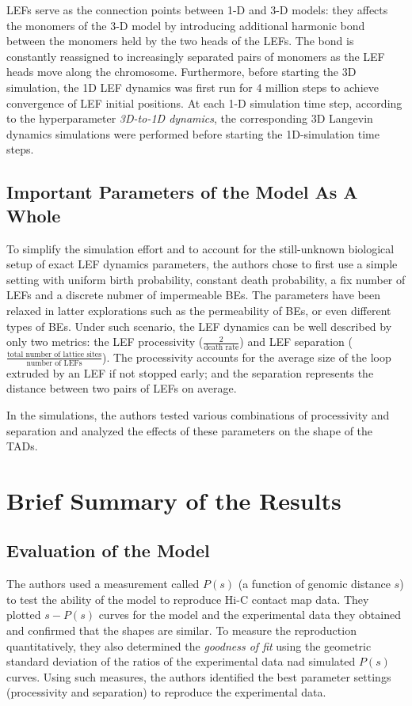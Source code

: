 \documentclass[11pt]{article}
\begin{document}
LEFs serve as the connection points between 1-D and 3-D models: they affects the monomers of the 3-D model by introducing additional harmonic bond between the monomers held by the two heads of the LEFs. The bond is constantly reassigned to increasingly separated pairs of monomers as the LEF heads move along the chromosome. Furthermore, before starting the 3D simulation, the 1D LEF dynamics was first run for 4 million steps to achieve convergence of LEF initial positions. At each 1-D simulation time step, according to the hyperparameter \textit{3D-to-1D dynamics}, the corresponding 3D Langevin dynamics simulations were performed before starting the 1D-simulation time steps.

\subsection{Important Parameters of the Model As A Whole}

To simplify the simulation effort and to account for the still-unknown biological setup of exact LEF dynamics parameters, the authors chose to first use a simple setting with uniform birth probability, constant death probability, a fix number of LEFs and a discrete nubmer of impermeable BEs. The parameters have been relaxed in latter explorations such as the permeability of BEs, or even different types of BEs. Under such scenario, the LEF dynamics can be well described by only two metrics: the LEF processivity ($\frac{2}{\text{death rate}}$) and LEF separation ($\frac{\text{total number of lattice sites}}{\text{number of LEFs}}$). The processivity accounts for the average size of the loop extruded by an LEF if not stopped early; and the separation represents the distance between two pairs of LEFs on average.

In the simulations, the authors tested various combinations of processivity and separation and analyzed the effects of these parameters on the shape of the TADs.

\section{Brief Summary of the Results}

\subsection{Evaluation of the Model}

The authors used a measurement called $P(s)$ (a function of genomic distance $s$) to test the ability of the model to reproduce Hi-C contact map data. They plotted $s-P(s)$ curves for the model and the experimental data they obtained and confirmed that the shapes are similar. To measure the reproduction quantitatively, they also determined the \textit{goodness of fit} using the geometric standard deviation of the ratios of the experimental data nad simulated $P(s)$ curves. Using such measures, the authors identified the best parameter settings (processivity and separation) to reproduce the experimental data.
\end{document}
